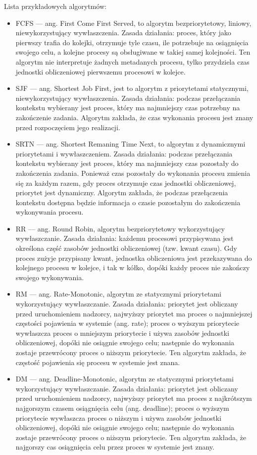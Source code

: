 \documentclass[../../main]{subfiles}
\begin{document}
Lista przykładowych algorytmów:

\begin{itemize}
    \item FCFS — ang. First Come First Served, to algorytm bezpriorytetowy, liniowy, niewykorzystujący wywłaszczenia. Zasada działania: proces, który jako pierwszy trafia do kolejki, otrzymuje tyle czasu, ile potrzebuje na osiągnięcia swojego celu, a kolejne procesy są obsługiwane w takiej samej kolejności. Ten algorytm nie interpretuje żadnych metadanych procesu, tylko przydziela czas jednostki obliczeniowej pierwszemu procesowi w kolejce.
    \item SJF — ang. Shortest Job First, jest to algorytm z priorytetami statycznymi, niewykorzystujący wywłaszczenia. Zasada działania: podczas przełączania kontekstu wybierany jest proces, który ma najmniejszy czas potrzebny na zakończenie zadania. Algorytm zakłada, że czas wykonania procesu jest znany przed rozpoczęciem jego realizacji.
    \item SRTN — ang. Shortest Remaning Time Next, to algorytm z dynamicznymi priorytetami i wywłaszczeniem. Zasada działania: podczas przełączania kontekstu wybierany jest proces, który ma najmniejszy czas pozostały do zakończenia zadania. Ponieważ czas pozostały do wykonania procesu zmienia się za każdym razem, gdy proces otrzymuje czas jednostki obliczeniowej, priorytet jest dynamiczny. Algorytm zakłada, że podczas przełączenia kontekstu dostępna będzie informacja o czasie pozostałym do zakończenia wykonywania procesu.
    \item RR — ang. Round Robin, algorytm bezpriorytetowy wykorzystujący wywłaszczanie. Zasada działania: każdemu procesowi przypisywana jest określona część zasobów jednostki obliczeniowej (tzw. kwant czasu). Gdy proces zużyje przypisany kwant, jednostka obliczeniowa jest przekazywana do kolejnego procesu w kolejce, i tak w kółko, dopóki każdy proces nie zakończy swojego wykonywania.
    \item RM — ang. Rate-Monotonic, algorytm ze statycznymi priorytetami wykorzystujący wywłaszczanie. Zasada działania: priorytet jest obliczany przed uruchomieniem nadzorcy, najwyższy priorytet ma proces o najmniejszej częstości pojawienia w systemie (ang. rate); proces o wyższym priorytecie wywłaszcza proces o mniejszym priorytecie i używa zasobów jednostki obliczeniowej, dopóki nie osiągnie swojego celu; następnie do wykonania zostaje przewrócony proces o niższym priorytecie. Ten algorytm zakłada, że częstość pojawienia się procesu w systemie jest znana.
    \item DM — ang. Deadline-Monotonic, algorytm ze statycznymi priorytetami wykorzystujący wywłaszczanie. Zasada działania: priorytet jest obliczany przed uruchomieniem nadzorcy, najwyższy priorytet ma proces z najkrótszym najgorszym czasem osiągnięcia celu (ang. deadline); proces o wyższym priorytecie wywłaszcza proces o niższym i używa zasobów jednostki obliczeniowej, dopóki nie osiągnie swojego celu; następnie do wykonania zostaje przewrócony proces o niższym priorytecie. Ten algorytm zakłada, że najgorszy cas osiągnięcia celu przez proces w systemie jest znany.

\end{itemize}
\end{document}
